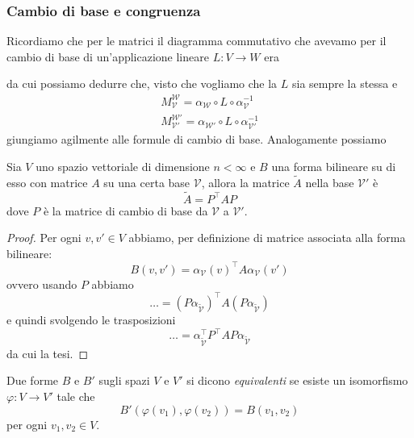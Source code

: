 \documentclass[11pt]{scrartcl}
\newcommand{\KK}{\mathbb{K}}
\begin{document}
	\subsubsection{Cambio di base e congruenza}
	Ricordiamo che per le matrici il diagramma commutativo che avevamo per il cambio di base di un'applicazione lineare $L:V\to W$ era 
	\begin{figure}[h]
		\begin{center}
		\end{center}
	\end{figure}
	da cui possiamo dedurre che, visto che vogliamo che la $L$ sia sempre la stessa e 
	\begin{gather*}
		M_{\mathcal{V}}^{\mathcal{W}}=\alpha_\mathcal{W}\circ L \circ \alpha_\mathcal{V}^{-1} \\
		M_{\mathcal{V}'}^{\mathcal{W}'}=\alpha_{\mathcal{W}'}\circ L \circ \alpha_{\mathcal{V}'}^{-1}
	\end{gather*}
	giungiamo agilmente alle formule di cambio di base. Analogamente possiamo
	\begin{proposition}
		Sia $V$ uno spazio vettoriale di dimensione $n<\infty$ e $B$ una forma bilineare su di esso con matrice $A$ su una certa base $\mathcal{V}$, allora la matrice $\tilde{A}$ nella base $\mathcal{V}'$ è
		$$\tilde{A}=P^\intercal A P$$
		dove $P$ è la matrice di cambio di base da $\mathcal{V}$ a $\mathcal{V}'$.
	\end{proposition}
	\begin{proof}
		Per ogni $v,v'\in V$ abbiamo, per definizione di matrice associata alla forma bilineare:
		$$B(v,v')=\alpha_\mathcal{V}(v)^\intercal A \alpha_\mathcal{V}(v')$$
		ovvero usando $P$ abbiamo
		$$\dots = \left(P\alpha_{\tilde{\mathcal{V}}}\right)^\intercal A \left(P\alpha_{\tilde{\mathcal{V}}}\right)$$
		e quindi svolgendo le trasposizioni
		$$\dots= \alpha_{\tilde{\mathcal{V}}}^\intercal P^\intercal A P \alpha_{\tilde{\mathcal{V}}}$$
		da cui la tesi.
	\end{proof}
	\begin{definition}
		Due forme $B$ e $B'$ sugli spazi $V$ e $V'$ si dicono \textit{equivalenti} se esiste un isomorfismo $\varphi:V\to V'$ tale che 
		$$B'\left(\varphi(v_1),\varphi(v_2)\right)=B(v_1,v_2)$$
		per ogni $v_1,v_2\in V$.
	\end{definition}
\end{document}
